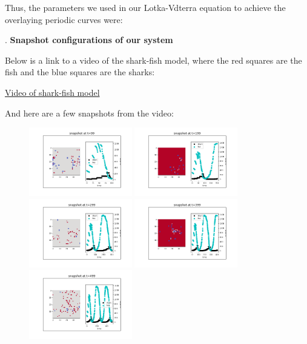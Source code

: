 \documentclass{article}
\begin{document}
Thus, the parameters we used in our Lotka-Vdterra equation to achieve the overlaying periodic curves were:\par
\bigskip
{}. \textbf{Snapshot configurations of our system}\par
Below is a link to a video of the shark-fish model, where the red squares are the fish and the blue squares are the sharks:\par
\href{https://github.com/LingfeiZhao/Group-Project-2b/blob/master/results/animationwithplot.mp4}{Video of shark-fish model}\par
And here are a few snapshots from the video:
\begin{figure}[htp]
    \centering
    \includegraphics[width=0.4\textwidth]{99.png} 
    \includegraphics[width=0.4\textwidth]{199.png} 
    \includegraphics[width=0.4\textwidth]{299.png} 
    \includegraphics[width=0.4\textwidth]{399.png}
    \includegraphics[width=0.4\textwidth]{499.png}

\end{figure}
\end{document}
